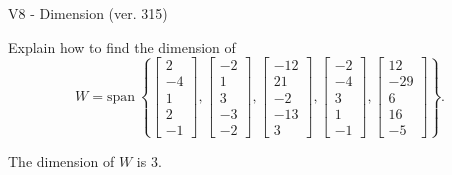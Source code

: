 \begin{exercise}
  \begin{exerciseTitle}V8 - Dimension (ver. 315)\end{exerciseTitle}
  \begin{exerciseStatement}
    Explain how to find the dimension of 
\[W=\mathrm{span}\ \left\{\left[\begin{array}{r}
2 \\
-4 \\
1 \\
2 \\
-1
\end{array}\right] , \left[\begin{array}{r}
-2 \\
1 \\
3 \\
-3 \\
-2
\end{array}\right] , \left[\begin{array}{r}
-12 \\
21 \\
-2 \\
-13 \\
3
\end{array}\right] , \left[\begin{array}{r}
-2 \\
-4 \\
3 \\
1 \\
-1
\end{array}\right] , \left[\begin{array}{r}
12 \\
-29 \\
6 \\
16 \\
-5
\end{array}\right]\right\}.\]



  \end{exerciseStatement}
  \begin{exerciseAnswer}
   The dimension of \(W\) is  \(3\).
  


  \end{exerciseAnswer}
\end{exercise}